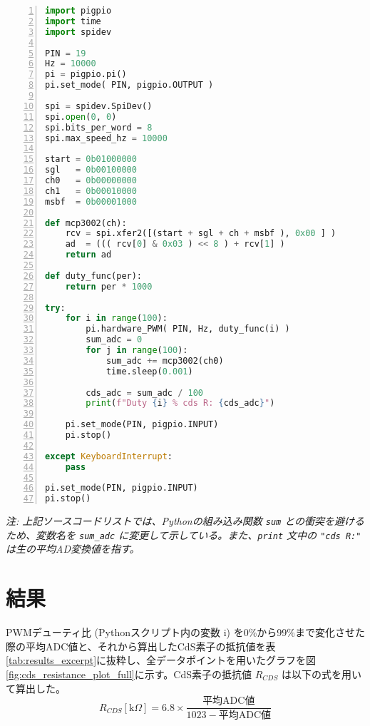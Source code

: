 \documentclass[a4paper,11pt,dvipdfmx]{jsarticle}
\begin{document}
\begin{lstlisting}[language=Python, caption=実験用Pythonスクリプト (Python/BuiltIn/exam6-4.py), label=lst:python_code, basicstyle={\ttfamily\scriptsize}, numbers=left, numberstyle=\tiny, breaklines=true, columns=flexible]
import pigpio
import time
import spidev

PIN = 19
Hz = 10000
pi = pigpio.pi()
pi.set_mode( PIN, pigpio.OUTPUT )

spi = spidev.SpiDev()
spi.open(0, 0)
spi.bits_per_word = 8
spi.max_speed_hz = 10000

start = 0b01000000
sgl   = 0b00100000
ch0   = 0b00000000
ch1   = 0b00010000
msbf  = 0b00001000

def mcp3002(ch):
    rcv = spi.xfer2([(start + sgl + ch + msbf ), 0x00 ] )
    ad  = ((( rcv[0] & 0x03 ) << 8 ) + rcv[1] )
    return ad

def duty_func(per):
    return per * 1000

try:
    for i in range(100):
        pi.hardware_PWM( PIN, Hz, duty_func(i) )
        sum_adc = 0 
        for j in range(100):
            sum_adc += mcp3002(ch0)
            time.sleep(0.001)
            
        cds_adc = sum_adc / 100
        print(f"Duty {i} % cds R: {cds_adc}")
        
    pi.set_mode(PIN, pigpio.INPUT)
    pi.stop()
    
except KeyboardInterrupt:
    pass

pi.set_mode(PIN, pigpio.INPUT)
pi.stop()

\end{lstlisting}
\textit{注: 上記ソースコードリストでは、Pythonの組み込み関数 \texttt{sum} との衝突を避けるため、変数名を \texttt{sum\_adc} に変更して示している。また、\texttt{print} 文中の \texttt{"cds R:"} は生の平均AD変換値を指す。}

\section{結果}
PWMデューティ比 (Pythonスクリプト内の変数 i) を0\%から99\%まで変化させた際の平均ADC値と、それから算出したCdS素子の抵抗値を表\ref{tab:results_excerpt}に抜粋し、全データポイントを用いたグラフを図\ref{fig:cds_resistance_plot_full}に示す。CdS素子の抵抗値 $R_{CDS}$ は以下の式を用いて算出した。
$$ R_{CDS} [\text{k}\Omega] = 6.8 \times \frac{\text{平均ADC値}}{1023 - \text{平均ADC値}} $$
\end{document}
